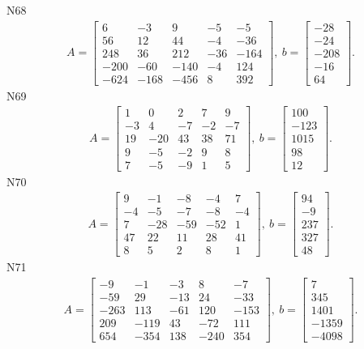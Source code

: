 \documentclass[11pt]{report}
\begin{document}
N68
\begin{align*}
 A = \left[\begin{matrix}6 & -3 & 9 & -5 & -5\\56 & 12 & 44 & -4 & -36\\248 & 36 & 212 & -36 & -164\\-200 & -60 & -140 & -4 & 124\\-624 & -168 & -456 & 8 & 392\end{matrix}\right],
\ b = \left[\begin{matrix}-28\\-24\\-208\\-16\\64\end{matrix}\right]. 
 \end{align*}
N69
\begin{align*}
 A = \left[\begin{matrix}1 & 0 & 2 & 7 & 9\\-3 & 4 & -7 & -2 & -7\\19 & -20 & 43 & 38 & 71\\9 & -5 & -2 & 9 & 8\\7 & -5 & -9 & 1 & 5\end{matrix}\right],
\ b = \left[\begin{matrix}100\\-123\\1015\\98\\12\end{matrix}\right]. 
 \end{align*}
N70
\begin{align*}
 A = \left[\begin{matrix}9 & -1 & -8 & -4 & 7\\-4 & -5 & -7 & -8 & -4\\7 & -28 & -59 & -52 & 1\\47 & 22 & 11 & 28 & 41\\8 & 5 & 2 & 8 & 1\end{matrix}\right],
\ b = \left[\begin{matrix}94\\-9\\237\\327\\48\end{matrix}\right]. 
 \end{align*}
N71
\begin{align*}
 A = \left[\begin{matrix}-9 & -1 & -3 & 8 & -7\\-59 & 29 & -13 & 24 & -33\\-263 & 113 & -61 & 120 & -153\\209 & -119 & 43 & -72 & 111\\654 & -354 & 138 & -240 & 354\end{matrix}\right],
\ b = \left[\begin{matrix}7\\345\\1401\\-1359\\-4098\end{matrix}\right]. 
 \end{align*}
\end{document}
